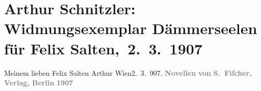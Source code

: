 

         
         \renewcommand{\erwaehntePersonen}{Personen: Felix Salten}
         \renewcommand{\erwaehnteInstitutionen}{Institutionen: S. Fischer Verlag}
         \renewcommand{\erwaehnteOrte}{Orte: Berlin, Wien}
         \renewcommand{\erwaehnteWerke}{Werke: Dämmerseelen. Novellen}
               \section[ Arthur Schnitzler: Widmungsexemplar Dämmerseelen für Felix Salten, 2. 3. 1907]{ Arthur Schnitzler: Widmungsexemplar Dämmerseelen für Felix
               Salten, 2. 3. 1907}\nopagebreak{}\rehead{ }\begin{ledgroupsized}[t]{13cm}\normalsize\beginnumbering{} \toendnotes[C]{\smallbreak\pagebreak[2]} 
\pstart
           \noindent{}{\pb}Meinem lieben Felix Salten\pend
           \pstart \spacefill\mbox{Arthur}\pend{}\pstart
           Wien2. 3. 907.\pend
           {\bigskip}\pstart
           \noindent{}\centering{}{\pb}\textcolor{gray}{\textbf{}}\pend
           \pstart
           \noindent{}\centering{}\textcolor{gray}{\textbf{Novellen}}\pend
           \pstart
           \noindent{}\centering{}\textcolor{gray}{\textbf{von}}\pend
           \pstart
           \noindent{}\centering{}\textcolor{gray}{\textbf{}}\pend
           {\bigskip}\pstart
           \noindent{}\centering{}\textcolor{gray}{\textbf{S. Fiſcher, Verlag, Berlin}}\pend
           \pstart
           \noindent{}\centering{}\textcolor{gray}{\textbf{1907}}\pend
           
         
         \endnumbering{}\end{ledgroupsized}  \newcommand{\dateiname}{L03612}\newcommand{\titel}{Arthur Schnitzler: Widmungsexemplar Dämmerseelen für Felix Salten, 2. 3. 1907}\newcommand{\editorInnen}{Martin Anton Müller und Laura Untner}
      